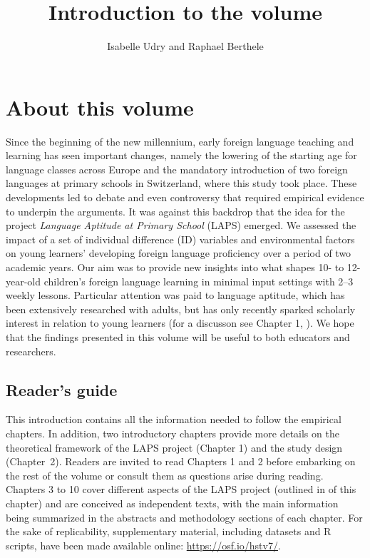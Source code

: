 \documentclass[output=paper]{langsci/langscibook}
\author{Isabelle Udry\affiliation{University of Fribourg, Institut de Plurilinguisme; Zurich University of Teacher Education} and Raphael Berthele\affiliation{University of Fribourg, Institut de Plurilinguisme}}
\title{Introduction to the volume}
\begin{document}
\maketitle 

\section{About this volume}

Since the beginning of the new millennium, early foreign language teaching and learning has seen important changes, namely the lowering of the starting age for language classes across Europe and the mandatory introduction of two foreign languages at primary schools in Switzerland, where this study took place. These developments led to debate and even controversy that required empirical evidence to underpin the arguments. It was against this backdrop that the idea for the project \textit{Language Aptitude at Primary School} (LAPS) emerged. We assessed the impact of a set of individual difference (ID) variables and environmental factors on young learners’ developing foreign language proficiency over a period of two academic years. Our aim was to provide new insights into what shapes 10- to 12-year-old children’s foreign language learning in minimal input settings with 2--3 weekly lessons. Particular attention was paid to language aptitude, which has been extensively researched with adults, but has only recently sparked scholarly interest in relation to young learners (for a discusson see Chapter 1, ). We hope that the findings presented in this volume will be useful to both educators and researchers. 

\subsection{Reader’s guide}

This introduction contains all the information needed to follow the empirical chapters. In addition, two introductory chapters provide more details on the theoretical framework of the LAPS project (Chapter 1) and the study design (Chapter~2). Readers are invited to read Chapters 1 and 2 before embarking on the rest of the volume or consult them as questions arise during reading. Chapters 3 to 10 cover different aspects of the LAPS project (outlined in  of this chapter) and are conceived as independent texts, with the main information being summarized in the abstracts and methodology sections of each chapter. For the sake of replicability, supplementary material, including datasets and R scripts, have been made available online: \url{https://osf.io/hstv7/}.
\end{document}
